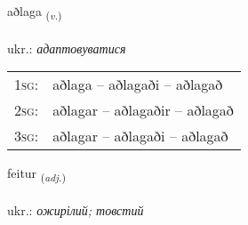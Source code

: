 \documentclass[frontgrid, backgrid]{flacards}\usepackage[]{graphicx}\usepackage[]{xcolor}
\begin{document}
\renewcommand{\flhead}{\vskip5pt \fboxsep=0pt {\small\bfseries\footnotesize Sagnorð | дієслово}}
\renewcommand{\fcfoot}{\vskip5pt \fboxsep=0pt \hspace{2pt}{\small\bfseries\footnotesize 3K}}

\renewcommand{\blhead}{\vskip5pt {\small\bfseries\footnotesize Sagnorð | дієслово }}
\renewcommand{\bcfoot}{\vskip5pt \hspace{2pt}{\small\bfseries\footnotesize 3K}}


{aðlaga \small{\textsubscript{(\textit{v.})}} \\[1ex] %
\textphonetic{[aðlaɣa]} \\
ukr.: \emph{адаптовуватися} \\  [2ex]
\renewcommand*{\arraystretch}{0.8}
\begin{tabular}{p{1cm}l}
\textsc{1sg}: & aðlaga -- aðlagaði -- aðlagað \\ 
\textsc{2sg}: & aðlagar -- aðlagaðir -- aðlagað \\ 
\textsc{3sg}: & aðlagar -- aðlagaði -- aðlagað \\ 
\end{tabular}
}

\renewcommand{\flhead}{\vskip5pt \fboxsep=0pt {\small\bfseries\footnotesize Lýsingarorð | прикметник}}
\renewcommand{\fcfoot}{\vskip5pt \fboxsep=0pt \hspace{2pt}{\small\bfseries\footnotesize 3K}}

\renewcommand{\blhead}{\vskip5pt {\small\bfseries\footnotesize Lýsingarorð | прикметник }}
\renewcommand{\bcfoot}{\vskip5pt \hspace{2pt}{\small\bfseries\footnotesize 3K}}


{feitur \small{\textsubscript{(\textit{adj.})}} \\[1ex] %
\textphonetic{[feiːtʏr]} \\
ukr.: \emph{ожирілий; товстий} \\  [2ex]
\renewcommand*{\arraystretch}{0.8}
}
\end{document}
